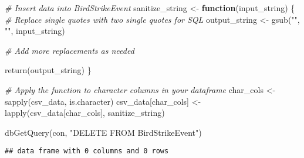 \documentclass[
]{article}
\newenvironment{Shaded}{\begin{snugshade}}{\end{snugshade}}
\newcommand{\CommentTok}[1]{\textcolor[rgb]{0.56,0.35,0.01}{\textit{#1}}}
\newcommand{\ControlFlowTok}[1]{\textcolor[rgb]{0.13,0.29,0.53}{\textbf{#1}}}
\newcommand{\DecValTok}[1]{\textcolor[rgb]{0.00,0.00,0.81}{#1}}
\newcommand{\FunctionTok}[1]{\textcolor[rgb]{0.00,0.00,0.00}{#1}}
\newcommand{\NormalTok}[1]{#1}
\newcommand{\OtherTok}[1]{\textcolor[rgb]{0.56,0.35,0.01}{#1}}
\newcommand{\SpecialCharTok}[1]{\textcolor[rgb]{0.00,0.00,0.00}{#1}}
\newcommand{\StringTok}[1]{\textcolor[rgb]{0.31,0.60,0.02}{#1}}
\begin{document}
\begin{Shaded}
\end{Shaded}

\begin{Shaded}
\begin{Highlighting}[]
\CommentTok{\# Insert data into BirdStrikeEvent}
\NormalTok{sanitize\_string }\OtherTok{\textless{}{-}} \ControlFlowTok{function}\NormalTok{(input\_string) \{}
  \CommentTok{\# Replace single quotes with two single quotes for SQL}
\NormalTok{  output\_string }\OtherTok{\textless{}{-}} \FunctionTok{gsub}\NormalTok{(}\StringTok{"\textquotesingle{}"}\NormalTok{, }\StringTok{"\textquotesingle{}\textquotesingle{}"}\NormalTok{, input\_string)}
  
  \CommentTok{\# Add more replacements as needed}
  
  \FunctionTok{return}\NormalTok{(output\_string)}
\NormalTok{\}}

\CommentTok{\# Apply the function to character columns in your dataframe}
\NormalTok{char\_cols }\OtherTok{\textless{}{-}} \FunctionTok{sapply}\NormalTok{(csv\_data, is.character)}
\NormalTok{csv\_data[char\_cols] }\OtherTok{\textless{}{-}} \FunctionTok{lapply}\NormalTok{(csv\_data[char\_cols], sanitize\_string)}

\FunctionTok{dbGetQuery}\NormalTok{(con, }\StringTok{"DELETE FROM BirdStrikeEvent"}\NormalTok{)}
\end{Highlighting}
\end{Shaded}

\begin{verbatim}
## data frame with 0 columns and 0 rows
\end{verbatim}
\end{document}
